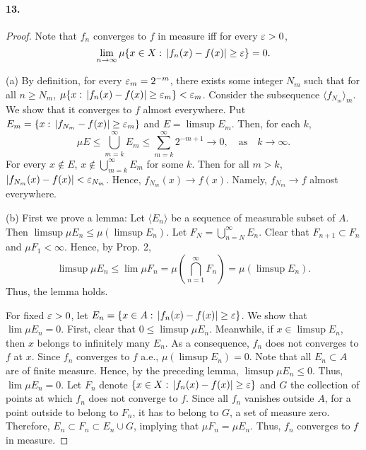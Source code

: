   \paragraph{13.}
  \begin{proof}
    Note that $f_n$ converges to $f$ in measure iff for every $\varepsilon>0$,
    \begin{equation*}
      \lim_{n\to\infty}\mu\{x\in X:\, |f_n(x)-f(x)|\ge\varepsilon\}=0.
    \end{equation*}\par
    (a) By definition, for every $\varepsilon_m=2^{-m}$, there exists some integer 
    $N_m$ such that for all $n\ge N_m$, $\mu\{x:\,|f_n(x)-f(x)|\ge\varepsilon_m\}<
    \varepsilon_m$. Consider the subsequence $\langle f_{N_m}\rangle_m$. We show that
    it converges to $f$ almost everywhere. Put $E_m=\{x:\,|f_{N_m}-f(x)|\ge
    \varepsilon_m\}$ and $E=\limsup E_m$. Then, for each $k$,
    \[
      \mu E\le \bigcup_{m=k}^\infty E_m\le \sum_{m=k}^\infty 2^{-m+1}\to 0,
      \quad\text{as}\quad k\to\infty.
    \]
    For every $x\notin E$, $x\notin\bigcup_{m=k}^\infty E_m$ for some $k$. Then
    for all $m>k$, $|f_{N_m}(x)-f(x)|<\varepsilon_{N_m}$. Hence, $f_{N_m}(x)\to f(x)$.
    Namely, $f_{N_m}\to f$ almost everywhere.\par
    (b) First we prove a lemma: Let $\langle E_n\rangle$ be a sequence of
    measurable subset of $A$. Then $\limsup\mu E_n\le \mu(\limsup E_n)$. Let
    $F_N=\bigcup_{n=N}^\infty E_n$. Clear that $F_{n+1}\subset F_n$ and $\mu 
    F_1<\infty$. Hence, by Prop. 2, 
    \[
      \limsup\mu E_n\le \lim\mu F_n=
      \mu\left(\bigcap_{n=1}^\infty F_n\right)=\mu(\limsup E_n).
    \]
    Thus, the lemma holds.\par
    For fixed $\varepsilon>0$, let $E_n=\{x\in A:\, |f_n(x)-f(x)|\ge\varepsilon\}$. We
    show that $\lim\mu E_n=0$. First, clear that $0\le\limsup\mu E_n$. 
    Meanwhile, if $x\in\limsup E_n$, then $x$ belongs to infinitely many $E_n$.
    As a consequence, $f_n$ does not converges to $f$ at $x$. Since $f_n$ 
    converges to $f$ a.e., $\mu(\limsup E_n)=0$. Note that all $E_n\subset A$ 
    are of finite measure. Hence, by the preceding lemma, $\limsup\mu E_n\le 
    0$. Thus, $\lim\mu E_n=0$. Let $F_n$ denote $\{x\in X:\,|f_n(x)-f(x)|\ge
    \varepsilon\}$ and $G$ the collection of points at which $f_n$ does not converge
    to $f$. Since all $f_n$ vanishes outside $A$, for a point outside to belong
    to $F_n$, it has to belong to $G$, a set of measure zero. Therefore, $E_n
    \subset F_n\subset E_n\cup G$, implying that $\mu F_n=\mu E_n$. Thus, $f_n$
    converges to $f$ in measure.\par

\end{proof}
